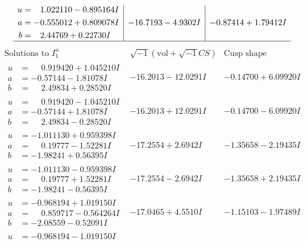 \documentclass[1p]{elsarticle_modified}
\theoremstyle{definition}
\newcommand{\I}{\sqrt{-1}}
\begin{document}
$$\begin{array}{c|c|c}
\begin{aligned}
u &= \phantom{-}1.022110 - 0.895164 I \\
a &= -0.555012 + 0.809078 I \\
b &= \phantom{-}2.44769 + 0.22730 I\end{aligned}
 & -16.7193 - 4.9302 I & -0.87414 + 1.79412 I\\
 \hline 
 \end{array}$$\newpage$$\begin{array}{c|c|c}  
\text{Solutions to }I^u_{1}& \I (\text{vol} + \sqrt{-1}CS) & \text{Cusp shape}\\
 \hline 
\begin{aligned}
u &= \phantom{-}0.919420 + 1.045210 I \\
a &= -0.57144 - 1.81078 I \\
b &= \phantom{-}2.49834 + 0.28520 I\end{aligned}
 & -16.2013 - 12.0291 I & -0.14700 + 6.09920 I \\ \hline\begin{aligned}
u &= \phantom{-}0.919420 - 1.045210 I \\
a &= -0.57144 + 1.81078 I \\
b &= \phantom{-}2.49834 - 0.28520 I\end{aligned}
 & -16.2013 + 12.0291 I & -0.14700 - 6.09920 I \\ \hline\begin{aligned}
u &= -1.011130 + 0.959398 I \\
a &= \phantom{-}0.19777 - 1.52281 I \\
b &= -1.98241 + 0.56395 I\end{aligned}
 & -17.2554 + 2.6942 I & -1.35658 - 2.19435 I \\ \hline\begin{aligned}
u &= -1.011130 - 0.959398 I \\
a &= \phantom{-}0.19777 + 1.52281 I \\
b &= -1.98241 - 0.56395 I\end{aligned}
 & -17.2554 - 2.6942 I & -1.35658 + 2.19435 I \\ \hline\begin{aligned}
u &= -0.968194 + 1.019150 I \\
a &= \phantom{-}0.859717 - 0.564264 I \\
b &= -2.08559 - 0.52091 I\end{aligned}
 & -17.0465 + 4.5510 I & -1.15103 - 1.97489 I \\ \hline\begin{aligned}
u &= -0.968194 - 1.019150 I \\

\end{aligned}
\end{array}$$
\end{document}

